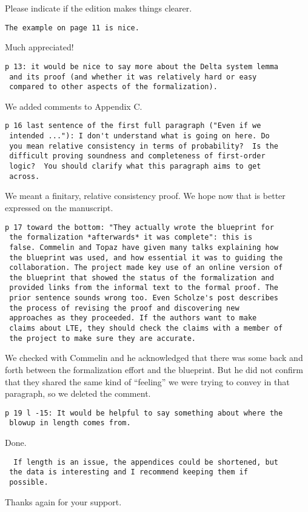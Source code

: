 \documentclass[runningheads]{llncs}
\begin{document}
Please indicate if the edition makes things clearer.

\begin{verbatim}
The example on page 11 is nice.
\end{verbatim}

Much appreciated!

\begin{verbatim}
p 13: it would be nice to say more about the Delta system lemma
 and its proof (and whether it was relatively hard or easy
 compared to other aspects of the formalization).
\end{verbatim}

We added comments to Appendix C.

\begin{verbatim}
p 16 last sentence of the first full paragraph ("Even if we
 intended ..."): I don't understand what is going on here. Do
 you mean relative consistency in terms of probability?  Is the
 difficult proving soundness and completeness of first-order
 logic?  You should clarify what this paragraph aims to get
 across.
\end{verbatim}

We meant a finitary, relative consistency proof. We hope now
that is better expressed on the manuscript.

\begin{verbatim}
p 17 toward the bottom: "They actually wrote the blueprint for
 the formalization *afterwards* it was complete": this is
 false. Commelin and Topaz have given many talks explaining how
 the blueprint was used, and how essential it was to guiding the
 collaboration. The project made key use of an online version of
 the blueprint that showed the status of the formalization and
 provided links from the informal text to the formal proof. The
 prior sentence sounds wrong too. Even Scholze's post describes
 the process of revising the proof and discovering new
 approaches as they proceeded. If the authors want to make
 claims about LTE, they should check the claims with a member of
 the project to make sure they are accurate.
\end{verbatim}

We checked with Commelin and he acknowledged that there was some
back and forth between the formalization effort and the
blueprint. But he did not confirm that they shared the same kind of
“feeling” we were trying to convey in that paragraph, so we deleted
the comment. 

\begin{verbatim}
p 19 l -15: It would be helpful to say something about where the
 blowup in length comes from.
\end{verbatim}

Done.

\begin{verbatim}
  If length is an issue, the appendices could be shortened, but
 the data is interesting and I recommend keeping them if
 possible.
\end{verbatim}

Thanks again for your support.
\end{document}
